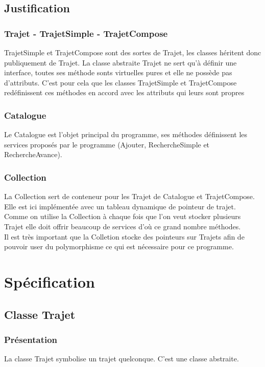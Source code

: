 \documentclass[10pt,a4paper,twoside]{article}
\begin{document}
\subsection{Justification}
\subsubsection{Trajet - TrajetSimple - TrajetCompose}
TrajetSimple et TrajetCompose sont des sortes de Trajet, les classes héritent donc publiquement de Trajet. La classe abstraite Trajet ne sert qu'à définir une interface, toutes ses méthode sonts virtuelles pures et elle ne possède pas d'attributs. C'est pour cela que les classes TrajetSimple et TrajetCompose redéfinissent ces méthodes en accord avec les attributs qui leurs sont propres

\subsubsection{Catalogue}
Le Catalogue est l'objet principal du programme, ses méthodes définissent les services proposés par le programme (Ajouter, RechercheSimple et RechercheAvance).

\subsubsection{Collection}
La Collection sert de conteneur pour les Trajet de Catalogue et TrajetCompose. Elle est ici implémentée avec un tableau dynamique de pointeur de trajet. Comme on utilise la Collection à chaque fois que l'on veut stocker plusieurs Trajet elle doit offrir beaucoup de services d'où ce grand nombre méthodes.\\
Il est très important que la Colletion stocke des pointeurs sur Trajets afin de pouvoir user du polymorphisme ce qui est nécessaire pour ce programme.

\newpage
\section{Spécification}
\subsection{Classe Trajet}
\subsubsection{Présentation}
La classe Trajet symbolise un trajet quelconque. C'est une classe abstraite.
\end{document}
